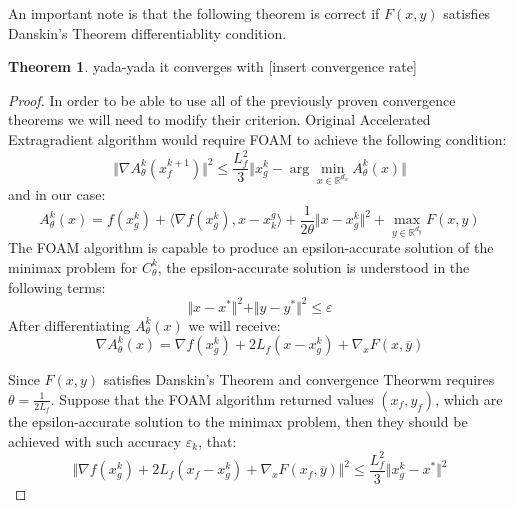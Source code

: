 \documentclass[12pt]{article}
\newcommand{\RR}{\mathcal{R}}
\theoremstyle{definition}
\newtheorem{theorem}{Theorem}
\theoremstyle{remark}
\def\RR{\mathbb{R}}
\def\eps{\varepsilon}
\begin{document}
An important note is that the following theorem is correct if $F(x,y)$ satisfies Danskin's Theorem differentiablity condition.

\begin{theorem}\label{FOAMAEconv}
yada-yada it converges with [insert convergence rate]
\end{theorem}
\begin{proof}
In order to be able to use all of the previously proven convergence theorems we will need to modify their criterion. Original Accelerated Extragradient algorithm would require FOAM to achieve the following condition:
\[
\Vert \nabla A^k_\theta(x^{k+1}_f) \Vert^2 \leq \frac{L_f^2}{3}\Vert x^k_g - \arg\min\limits_{x \in \RR^{d_x}} A^k_\theta(x) \Vert 
\]
and in our case:
\[
A^k_\theta(x) = f(x^k_g) + \langle \nabla f(x^k_g), x - x_k^g \rangle + \frac{1}{2\theta} \Vert x-x^k_g \Vert^2 + \max\limits_{y \in \RR^{d_y}}F(x, y)
\]
The FOAM algorithm is capable to produce an epsilon-accurate solution of the minimax problem for $C^k_\theta$, the epsilon-accurate solution is understood in the following terms:
\[
\Vert x - x^* \Vert^2 + \Vert y - y^* \Vert^2 \leq \eps
\]
After differentiating $A^k_\theta(x)$ we will receive:
\[
\nabla A^k_\theta(x) = \nabla f(x^k_g) + 2L_f( x - x^k_g) + \nabla_x F(x, \overline{y})
\]

Since $F(x,y)$ satisfies Danskin's Theorem and convergence Theorwm requires $\theta = \frac{1}{2L_f}$. Suppose that the FOAM algorithm returned values $(x_f, y_f)$, which are the epsilon-accurate solution to the minimax problem, then they should be achieved with such accuracy $\eps_k$, that:
\[
\Vert \nabla f(x^k_g) + 2L_f (x_f - x^k_g)+ \nabla_x F(x_f, \overline{y}) \Vert^2 \leq \frac{L_f^2}{3}\Vert x^k_g - x^* \Vert^2 
\]


\end{proof}
\end{document}
